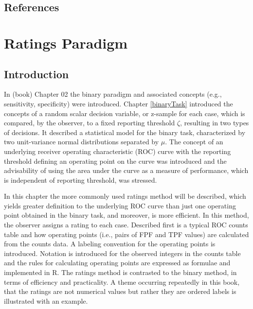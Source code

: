 \documentclass[
]{book}
\begin{document}
\hypertarget{binaryTask-references}{%
\section{References}\label{binaryTask-references}}

\hypertarget{ratingsParadigm}{%
\chapter{Ratings Paradigm}\label{ratingsParadigm}}

\hypertarget{introduction}{%
\section{Introduction}\label{introduction}}

In (book) Chapter 02 the binary paradigm and associated concepts (e.g., sensitivity, specificity) were introduced. Chapter \ref{binaryTask} introduced the concepts of a random scalar decision variable, or z-sample for each case, which is compared, by the observer, to a fixed reporting threshold \(\zeta\), resulting in two types of decisions. It described a statistical model for the binary task, characterized by two unit-variance normal distributions separated by \(\mu\). The concept of an underlying receiver operating characteristic (ROC) curve with the reporting threshold defining an operating point on the curve was introduced and the advisability of using the area under the curve as a measure of performance, which is independent of reporting threshold, was stressed.

In this chapter the more commonly used ratings method will be described, which yields greater definition to the underlying ROC curve than just one operating point obtained in the binary task, and moreover, is more efficient. In this method, the observer assigns a rating to each case. Described first is a typical ROC counts table and how operating points (i.e., pairs of FPF and TPF values) are calculated from the counts data. A labeling convention for the operating points is introduced. Notation is introduced for the observed integers in the counts table and the rules for calculating operating points are expressed as formulae and implemented in R. The ratings method is contrasted to the binary method, in terms of efficiency and practicality. A theme occurring repeatedly in this book, that the ratings are not numerical values but rather they are ordered labels is illustrated with an example.
\end{document}
